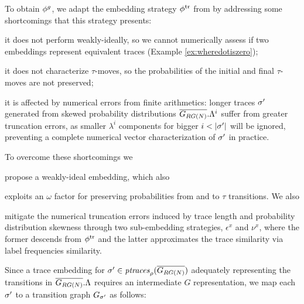 {{To obtain $\gorgembed$, we adapt the embedding strategy} $\trembed$ from \cite{LodhiSSCW02} {by addressing some short\-comings that this strategy presents:}
\begin{alphalist}
 \item it does not perform weakly-ideally, so we cannot numerically assess if two embeddings represent equivalent traces (Example \ref{ex:wheredotiszero});
 \item it does not characterize $\tau$-moves, so the probabilities of the initial and final $\tau$-moves are not preserved;
 \item it is affected by numerical errors from finite arithmetics: longer traces $\nonlogtrace$ generated from skewed probability distributions $\expN.\Lambda^i$ suffer from greater truncation errors, as smaller $\lambda^i$ components for bigger $i<|\nonlogtrace|$ will be ignored, preventing a complete numerical vector characterization of  $\nonlogtrace$ in practice.
\end{alphalist}

{To overcome these shortcomings we} \begin{alphalist} \item propose a weakly-ideal embedding, which also \item exploits an
$\omega$ factor for preserving probabilities from and to $\tau$ transitions. We also \item mitigate the
numerical truncation errors induced by trace length and probability distribution skewness through two sub-embedding strategies,
$\epsilon^x$ and $\nu^x$, where the former descends from $\trembed$ and the latter approximates the trace similarity via label frequencies similarity.
\end{alphalist}

Since a trace embedding for $\nonlogtrace\in\WCal{\pmin}{n}$ adequately representing the transitions in $\expN.\Lambda$ requires an intermediate $G$ representation, we map each $\nonlogtrace$ to a transition graph $\tg_\nonlogtrace$ as follows:}
